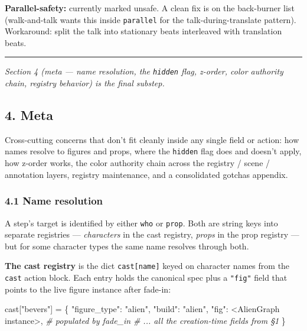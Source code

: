 \documentclass[
  12pt,
  letterpaper,
]{book}
\newenvironment{Shaded}{}{}
\newcommand{\CommentTok}[1]{\textcolor[rgb]{0.38,0.63,0.69}{\textit{#1}}}
\newcommand{\NormalTok}[1]{#1}
\newcommand{\OperatorTok}[1]{\textcolor[rgb]{0.40,0.40,0.40}{#1}}
\newcommand{\StringTok}[1]{\textcolor[rgb]{0.25,0.44,0.63}{#1}}
\begin{document}
\textbf{Parallel-safety:} currently marked unsafe. A clean fix is on the
back-burner list (walk-and-talk wants this inside \texttt{parallel} for
the talk-during-translate pattern). Workaround: split the talk into
stationary beats interleaved with translation beats.

\begin{center}\rule{0.5\linewidth}{0.5pt}\end{center}

\emph{Section 4 (meta --- name resolution, the \texttt{hidden} flag,
z-order, color authority chain, registry behavior) is the final
substep.}

\subsection{4. Meta}\label{meta}

Cross-cutting concerns that don't fit cleanly inside any single field or
action: how names resolve to figures and props, where the
\texttt{hidden} flag does and doesn't apply, how z-order works, the
color authority chain across the registry / scene / annotation layers,
registry maintenance, and a consolidated gotchas appendix.

\subsubsection{4.1 Name resolution}\label{name-resolution}

A step's target is identified by either \texttt{who} or \texttt{prop}.
Both are string keys into separate registries --- \emph{characters} in
the cast registry, \emph{props} in the prop registry --- but for some
character types the same name resolves through both.

\textbf{The cast registry} is the dict \texttt{cast{[}name{]}} keyed on
character names from the \texttt{cast} action block. Each entry holds
the canonical spec plus a \texttt{"fig"} field that points to the live
figure instance after fade-in:

\begin{Shaded}
\begin{Highlighting}[]
\NormalTok{cast[}\StringTok{"bevers"}\NormalTok{] }\OperatorTok{=}\NormalTok{ \{}
    \StringTok{"figure\_type"}\NormalTok{: }\StringTok{"alien"}\NormalTok{,}
    \StringTok{"build"}\NormalTok{: }\StringTok{"alien"}\NormalTok{,}
    \StringTok{"fig"}\NormalTok{: }\OperatorTok{\textless{}}\NormalTok{AlienGraph instance}\OperatorTok{\textgreater{}}\NormalTok{,  }\CommentTok{\# populated by fade\_in}
    \CommentTok{\# ... all the creation{-}time fields from §1}
\NormalTok{\}}
\end{Highlighting}
\end{Shaded}
\end{document}
